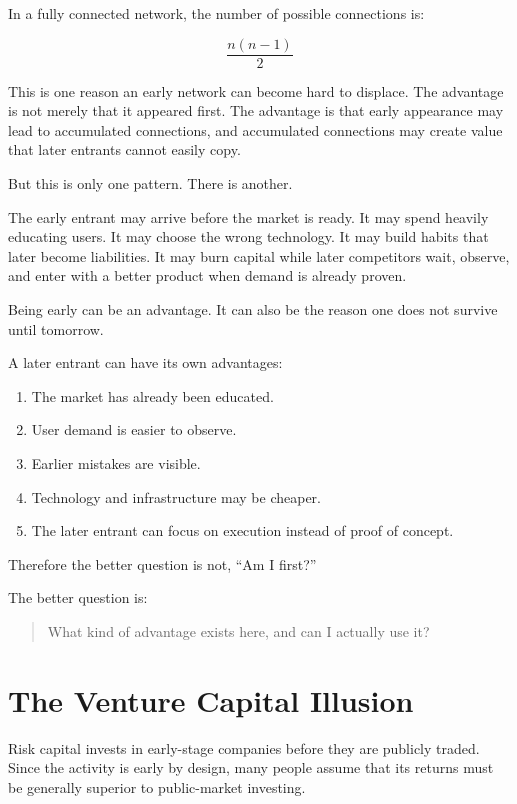In a fully connected network, the number of possible connections is:

\[
\frac{n(n-1)}{2}
\]

This is one reason an early network can become hard to displace. The advantage is not merely that it appeared first. The advantage is that early appearance may lead to accumulated connections, and accumulated connections may create value that later entrants cannot easily copy.

But this is only one pattern. There is another.

The early entrant may arrive before the market is ready. It may spend heavily educating users. It may choose the wrong technology. It may build habits that later become liabilities. It may burn capital while later competitors wait, observe, and enter with a better product when demand is already proven.

Being early can be an advantage. It can also be the reason one does not survive until tomorrow.

A later entrant can have its own advantages:

\begin{enumerate}
\item The market has already been educated.
\item User demand is easier to observe.
\item Earlier mistakes are visible.
\item Technology and infrastructure may be cheaper.
\item The later entrant can focus on execution instead of proof of concept.
\end{enumerate}

Therefore the better question is not, ``Am I first?''

The better question is:

\begin{quote}
What kind of advantage exists here, and can I actually use it?
\end{quote}

\section*{The Venture Capital Illusion}

Risk capital invests in early-stage companies before they are publicly traded. Since the activity is early by design, many people assume that its returns must be generally superior to public-market investing.

